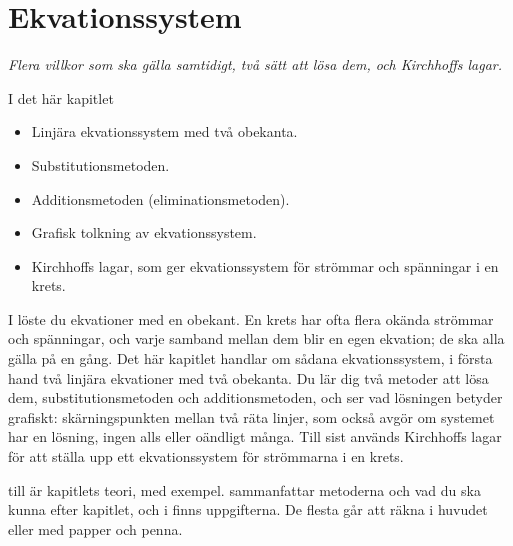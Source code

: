 
\chapter{Ekvationssystem}
\label{c4:ch}

{\large\itshape Flera villkor som ska gälla samtidigt, två sätt att lösa dem, och Kirchhoffs
lagar.\par}

\begin{chapterbox}{I det här kapitlet}
\begin{itemize}
  \item Linjära ekvationssystem med två obekanta.
  \item Substitutionsmetoden.
  \item Additionsmetoden (eliminationsmetoden).
  \item Grafisk tolkning av ekvationssystem.
  \item Kirchhoffs lagar, som ger ekvationssystem för strömmar och spänningar i en krets.
\end{itemize}
\end{chapterbox}

I  löste du ekvationer med en obekant. En krets har ofta flera okända strömmar och
spänningar, och varje samband mellan dem blir en egen ekvation; de ska alla gälla på en gång. Det
här kapitlet handlar om sådana ekvationssystem, i första hand två linjära ekvationer med två
obekanta. Du lär dig två metoder att lösa dem, substitutionsmetoden och additionsmetoden, och ser
vad lösningen betyder grafiskt: skärningspunkten mellan två räta linjer, som också avgör om
systemet har en lösning, ingen alls eller oändligt många. Till sist används Kirchhoffs lagar för
att ställa upp ett ekvationssystem för strömmarna i en krets.

 till  är kapitlets teori, med exempel.
 sammanfattar metoderna och vad du ska kunna efter kapitlet, och i
 finns uppgifterna. De flesta går att räkna i huvudet eller med papper och
penna.




